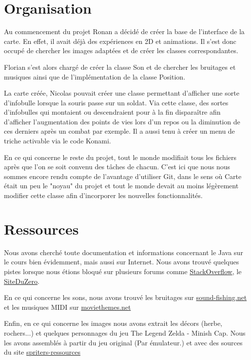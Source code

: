 \documentclass{article}
\begin{document}
\section{Organisation}
Au commencement du projet Ronan a décidé de créer la base de l'interface de la carte.
En effet, il avait déjà des expériences en 2D et animations.
Il s'est donc occupé de chercher les images adaptées et de créer les classes correspondantes.

Florian s'est alors chargé de créer la classe Son et de chercher les bruitages et musiques ainsi que de l'implémentation de la classe Position.

La carte créée, Nicolas pouvait créer une classe permettant d'afficher une sorte d'infobulle lorsque la souris passe sur un soldat.
Via cette classe, des sortes d'infobulles qui montaient ou descendraient pour à la fin disparaître afin d'afficher l'augmentation des points de vies lors d'un repos ou la diminution de ces derniers après un combat par exemple.
Il a aussi tenu à créer un menu de triche activable via le code Konami.

En ce qui concerne le reste du projet, tout le monde modifiait tous les fichiers après que l'on se soit convenu des tâches de chacun.
C'est ici que nous nous sommes encore rendu compte de l'avantage d'utiliser Git, dans le sens où Carte était un peu le "noyau" du projet et tout le monde devait au moins légèrement modifier cette classe afin d'incorporer les nouvelles fonctionnalités.

\section{Ressources}
Nous avons cherché toute documentation et informations concernant le Java sur le cours bien évidemment, mais aussi sur Internet.
Nous avons trouvé quelques pistes lorsque nous étions bloqué sur plusieurs forums comme \href{http://stackoverflow.com}{StackOverflow}, le \href{http://siteduzero.com}{SiteDuZero}.

En ce qui concerne les sons, nous avons trouvé les bruitages sur \href{http://www.sound-fishing.net}{sound-fishing.net} et les musiques MIDI sur \href{http://moviethemes.net/lord-rings.html}{moviethemes.net}

Enfin, en ce qui concerne les images nous avons extrait les décors (herbe, rochers...) et quelques personnages du jeu The Legend Zelda - Minish Cap. Nous les avons assemblés à partir du jeu original (Par émulateur.) et avec des sources du site \href{http://www.spriters-resource.com/}{spriters-ressources}
\end{document}
